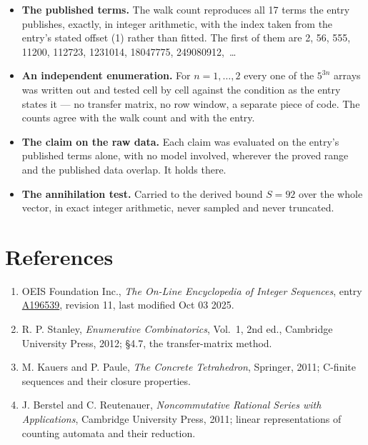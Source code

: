 \documentclass[11pt]{article}
\theoremstyle{definition}
\begin{document}
\begin{itemize}

\item {\bfseries The published terms.} The walk count reproduces all 17 terms the entry publishes, exactly, in integer arithmetic, with the index taken from the entry's stated offset (1) rather than fitted. The first of them are 2, 56, 555, 11200, 112723, 1231014, 18047775, 249080912,~\dots

\item {\bfseries An independent enumeration.} For $n = 1,\dots,2$ every one of the $5^{3n}$ arrays was written out and tested cell by cell against the condition as the entry states it --- no transfer matrix, no row window, a separate piece of code. The counts agree with the walk count and with the entry.

\item {\bfseries The claim on the raw data.} Each claim was evaluated on the entry's published terms alone, with no model involved, wherever the proved range and the published data overlap. It holds there.

\item {\bfseries The annihilation test.} Carried to the derived bound $S = 92$ over the whole vector, in exact integer arithmetic, never sampled and never truncated.

\end{itemize}

\section{References}

\begin{enumerate}

\item OEIS Foundation Inc., \emph{The On-Line Encyclopedia of Integer Sequences}, entry \href{https://oeis.org/A196539}{A196539}, revision 11, last modified Oct 03 2025.

\item R. P. Stanley, \emph{Enumerative Combinatorics}, Vol.~1, 2nd ed., Cambridge University Press, 2012; \S4.7, the transfer-matrix method.

\item M. Kauers and P. Paule, \emph{The Concrete Tetrahedron}, Springer, 2011; C-finite sequences and their closure properties.

\item J. Berstel and C. Reutenauer, \emph{Noncommutative Rational Series with Applications}, Cambridge University Press, 2011; linear representations of counting automata and their reduction.

\end{enumerate}
\end{document}
